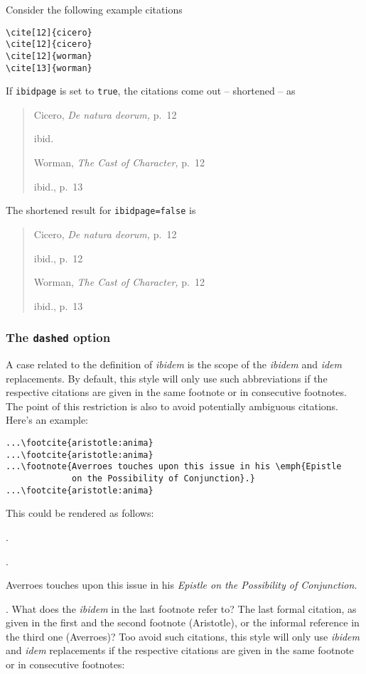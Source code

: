 \documentclass[a4paper]{article}
\newenvironment*{pseudofootnotes}
  {\list\labelenumi{%
     \def\makelabel##1{\hss\llap{##1}}%
     \def\labelenumi{\theenumi}%
     \usecounter{enumi}%
     \setlength{\leftmargin}{0pt}%
     \setlength{\labelsep}{0.75em}%
     \setlength{\itemsep}{0pt}%
     \setlength{\parsep}{0pt}}%
   \citereset
   \footnotesize
   \def\footcite##1{\item\Cite{##1}.}%
   \def\footnote##1{\item##1}}
  {\endlist}
\begin{document}
Consider the following example citations
\begin{verbatim}
\cite[12]{cicero}
\cite[12]{cicero}
\cite[12]{worman}
\cite[13]{worman}
\end{verbatim}
%
If \texttt{ibidpage} is set to \texttt{true}, the citations
come out -- shortened -- as
\begin{quote}
Cicero, \emph{De natura deorum,} p.~12

ibid.

Worman, \emph{The Cast of Character,} p.~12

ibid., p.~13
\end{quote}
%
The shortened result for \texttt{ibidpage=false} is
\begin{quote}
Cicero, \emph{De natura deorum,} p.~12

ibid., p.~12

Worman, \emph{The Cast of Character,} p.~12

ibid., p.~13
\end{quote}

\subsubsection*{The \texttt{dashed} option}

A case related to the definition of \emph{ibidem} is the scope of
the \emph{ibidem} and \emph{idem} replacements. By default, this
style will only use such abbreviations if the respective citations
are given in the same footnote or in consecutive footnotes. The
point of this restriction is also to avoid potentially ambiguous
citations. Here's an example:

\begin{verbatim}
...\footcite{aristotle:anima}
...\footcite{aristotle:anima}
...\footnote{Averroes touches upon this issue in his \emph{Epistle
             on the Possibility of Conjunction}.}
...\footcite{aristotle:anima}
\end{verbatim}
%
This could be rendered as follows:

\begin{pseudofootnotes}
\footcite{aristotle:anima}
\footcite{aristotle:anima}
\footnote{Averroes touches upon this issue in his \emph{Epistle on
the Possibility of Conjunction}.}
\footcite{aristotle:anima}
\end{pseudofootnotes}
%
What does the \emph{ibidem} in the last footnote refer to? The last
formal citation, as given in the first and the second footnote
(Aristotle), or the informal reference in the third one (Averroes)?
Too avoid such citations, this style will only use \emph{ibidem} and
\emph{idem} replacements if the respective citations are given in
the same footnote or in consecutive footnotes:
\end{document}
